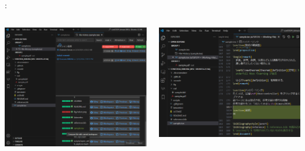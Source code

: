 \documentclass[aspectratio=169,dvipdfmx,cjk]{beamer}
\begin{document}
\begin{frame}{\insertsection \thesubsection: \insertsubsection}
\begin{columns}
\begin{column}{0.3\textwidth}
      \includegraphics[width=1.0\linewidth]{fig/git-history2.png}
    \end{column}
    \begin{column}{0.3\textwidth}
      \includegraphics[width=1.0\linewidth]{fig/git-history3.png}
    \end{column}
  \end{columns}
\end{frame}
\end{document}
